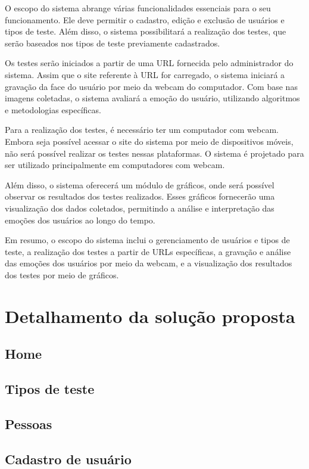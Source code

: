O escopo do sistema abrange várias funcionalidades essenciais para o seu funcionamento. Ele deve permitir o cadastro, edição e exclusão de usuários e tipos de teste. Além disso, o sistema possibilitará a realização dos testes, que serão baseados nos tipos de teste previamente cadastrados.

Os testes serão iniciados a partir de uma URL fornecida pelo administrador do sistema. Assim que o site referente à URL for carregado, o sistema iniciará a gravação da face do usuário por meio da webcam do computador. Com base nas imagens coletadas, o sistema avaliará a emoção do usuário, utilizando algoritmos e metodologias específicas.

Para a realização dos testes, é necessário ter um computador com webcam. Embora seja possível acessar o site do sistema por meio de dispositivos móveis, não será possível realizar os testes nessas plataformas. O sistema é projetado para ser utilizado principalmente em computadores com webcam.

Além disso, o sistema oferecerá um módulo de gráficos, onde será possível observar os resultados dos testes realizados. Esses gráficos fornecerão uma visualização dos dados coletados, permitindo a análise e interpretação das emoções dos usuários ao longo do tempo.

Em resumo, o escopo do sistema inclui o gerenciamento de usuários e tipos de teste, a realização dos testes a partir de URLs específicas, a gravação e análise das emoções dos usuários por meio da webcam, e a visualização dos resultados dos testes por meio de gráficos.

\section{Detalhamento da solução proposta}

\subsection{Home}

\subsection{Tipos de teste}

\subsection{Pessoas}

\subsection{Cadastro de usuário}

